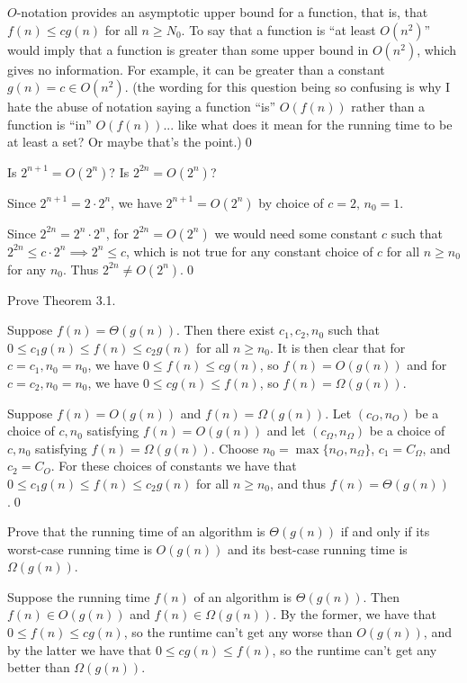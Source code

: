 \sol $O$-notation provides an asymptotic upper bound for a function, that is, that $f(n) \leq cg(n)$ for all $n \geq N_0$. To say that a function is ``at least $O(n^2)$'' would imply that a function is greater than some upper bound in $O(n^2)$, which gives no information. For example, it can be greater than a constant $g(n) = c \in O(n^2)$. (the wording for this question being so confusing is why I hate the abuse of notation saying a function ``is'' $O(f(n))$ rather than a function is ``in'' $O(f(n))$... like what does it mean for the running time to be at least a set? Or maybe that's the point.)\qed

 Is $2^{n+1} = O(2^n)$? Is $2^{2n} = O(2^n)$?

\sol Since $2^{n+1} = 2\cdot 2^n$, we have $2^{n+1} = O(2^n)$ by choice of $c = 2, \, n_0 = 1$.

Since $2^{2n} = 2^n \cdot 2^n$, for $2^{2n} = O(2^n)$ we would need some constant $c$ such that $2^{2n} \leq c\cdot 2^n \implies 2^n \leq c$, which is not true for any constant choice of $c$ for all $n \geq n_0$ for any $n_0$. Thus $2^{2n} \neq O(2^n).$\qed

 Prove Theorem 3.1.

\pf Suppose $f(n) = \Theta(g(n))$. Then there exist $c_1, c_2, n_0$ such that $0 \leq c_1 g(n) \leq f(n) \leq c_2 g(n)$ for all $n \geq n_0$. It is then clear that for $c = c_1, n_0 = n_0$, we have $0 \leq f(n) \leq c g(n)$, so $f(n) = O(g(n))$ and for $c = c_2, n_0 = n_0$, we have $0 \leq c g(n) \leq f(n)$, so $f(n) = \Omega(g(n))$.

Suppose $f(n) = O(g(n))$ and $f(n) = \Omega(g(n))$. Let $(c_O, n_O)$ be a choice of $c, n_0$ satisfying $f(n) = O(g(n))$ and let $(c_\Omega, n_\Omega)$ be a choice of $c, n_0$ satisfying $f(n) = \Omega(g(n))$. Choose $n_0 = \max\{n_O, n_\Omega\}$, $c_1 = C_\Omega$, and $c_2 = C_O$. For these choices of constants we have that $0 \leq c_1 g(n) \leq f(n) \leq c_2 g(n)$ for all $n \geq n_0$, and thus $f(n) = \Theta(g(n))$.\qed

 Prove that the running time of an algorithm is $\Theta(g(n))$ if and only if its worst-case running time is $O(g(n))$ and its best-case running time is $\Omega(g(n))$.

\pf Suppose the running time $f(n)$ of an algorithm is $\Theta(g(n))$. Then $f(n) \in O(g(n))$ and $f(n) \in \Omega(g(n))$. By the former, we have that $0 \leq f(n) \leq cg(n)$, so the runtime can't get any worse than $O(g(n))$, and by the latter we have that $0 \leq cg(n) \leq f(n)$, so the runtime can't get any better than $\Omega(g(n))$. 

